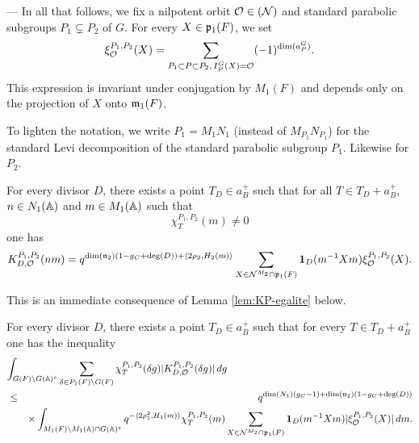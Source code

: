 \begin{paragr} --- \label{S:premiere-majoration} In all that follows, we fix a nilpotent orbit $\mathcal{O}\in (\mathcal{N})$ and standard parabolic subgroups $P_1\subsetneq P_2$ of $G$. For every $X\in \mathfrak{p}_1(F)$, we set
\begin{equation}
  \label{eq:xiP1P2}
  \xi_{\mathcal{O}}^{P_1,P_2}(X)=\sum_{P_1\subset P\subset P_2,\, I_P^G(X)=\mathcal{O}} (-1)^{\dim(a_P^G)}.
\end{equation}
This expression is invariant under conjugation by $M_1(F)$ and depends only on the projection of $X$ onto $\mathfrak{m}_1(F)$.

To lighten the notation, we write $P_1=M_1N_1$ (instead of $M_{P_1}N_{P_1}$) for the standard Levi decomposition of the standard parabolic subgroup $P_1$. Likewise for $P_2$.

\begin{proposition}\label{prop:KP1P2}
  For every divisor $D$, there exists a point $T_D\in a_B^+$ such that for all $T\in T_D+a_B^+$, $n\in N_1(\mathbb{A})$ and $m\in M_1(\mathbb{A})$ such that
$$\chi_T^{P_1,P_2}(m)\neq 0$$
one has
$$K^{P_1,P_2}_{D,\mathcal{O}}(nm)= q^{\dim(\mathfrak{n}_2)(1-g_C+\deg(D))+\langle 2\rho_2,H_2(m)\rangle} \sum_{X\in \mathcal{N}^{M_2}\cap \mathfrak{p}_1(F)} \mathbf{1}_D(m^{-1}Xm) \xi_{\mathcal{O}}^{P_1,P_2}(X).$$
\end{proposition}

\begin{preuve}
  This is an immediate consequence of Lemma \ref{lem:KP-egalite} below.
\end{preuve}

\begin{corollaire}\label{cor:majoration-Iwasawa}
  For every divisor $D$, there exists a point $T_D\in a_B^+$ such that for every $T\in T_D+a_B^+$ one has the inequality
\begin{eqnarray*}
  \lefteqn{\int_{G(F)\backslash G(\AAA)^e} \sum_{\delta\in P_1(F)\backslash G(F)} \chi_T^{P_1,P_2}(\delta g)|K^{P_1,P_2}_{D,\oc}(\delta g)|\, dg}\\
  &\leq& q^{\dim(N_1)(g_C-1)+\dim(\ngo_2)(1-g_C+\deg(D))}\\
  &&\times \int_{M_1(F)\backslash M_1(\AAA)\cap G(\AAA)^e} q^{-\langle 2\rho_1^2,H_1(m)\rangle} \chi_T^{P_1,P_2}(m) \sum_{X\in \nc^{M_2}\cap \pgo_1(F)} \mathbf{1}_D(m^{-1}Xm)|\xi_{\oc}^{P_1,P_2}(X)|\, dm.
\end{eqnarray*}
\end{corollaire}


\end{paragr}
